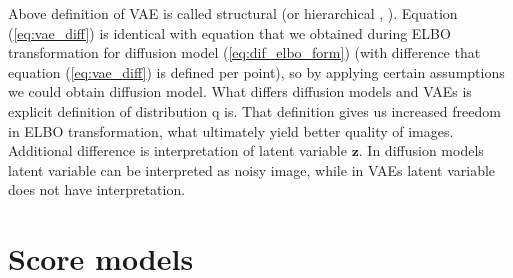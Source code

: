 \documentclass[10pt]{article}
\begin{document}
Above definition of VAE is called structural (or hierarchical \cite{Structured_model}, \cite{Ladder_models} ).
Equation (\ref{eq:vae_diff}) is identical with equation that we obtained during ELBO transformation for diffusion model (\ref{eq:dif_elbo_form}) (with  difference that equation (\ref{eq:vae_diff}) is defined per point), so by applying certain assumptions we could obtain diffusion model. What differs diffusion models and VAEs is explicit definition of distribution q is. That definition gives us increased freedom in ELBO transformation, what ultimately yield better quality of images. Additional difference is interpretation of latent variable $\textbf{z}$. In diffusion models latent variable can be interpreted as noisy image, while in VAEs latent variable does not have interpretation. 
\section{Score models}
\end{document}
